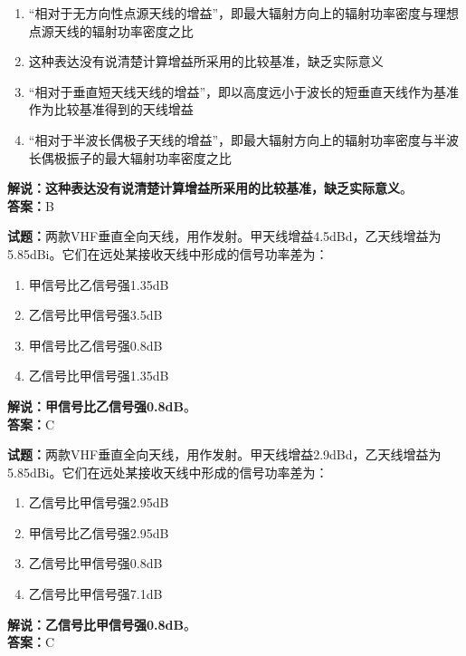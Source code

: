 \documentclass{ctexbook}
\begin{document}
\begin{enumerate}[leftmargin=3em]
	\item “相对于无方向性点源天线的增益”，即最大辐射方向上的辐射功率密度与理想点源天线的辐射功率密度之比
	\item 这种表达没有说清楚计算增益所采用的比较基准，缺乏实际意义
	\item “相对于垂直短天线天线的增益”，即以高度远小于波长的短垂直天线作为基准作为比较基准得到的天线增益
	\item “相对于半波长偶极子天线的增益”，即最大辐射方向上的辐射功率密度与半波长偶极振子的最大辐射功率密度之比
\end{enumerate}

\noindent\textbf{解说：这种表达没有说清楚计算增益所采用的比较基准，缺乏实际意义}。\\\noindent\textbf{答案：}B


\bigskip


\noindent\textbf{试题：}两款VHF垂直全向天线，用作发射。甲天线增益4.5dBd，乙天线增益为5.85dBi。它们在远处某接收天线中形成的信号功率差为：

\begin{enumerate}[leftmargin=3em]
	\item 甲信号比乙信号强1.35dB
	\item 乙信号比甲信号强3.5dB
	\item 甲信号比乙信号强0.8dB
	\item 乙信号比甲信号强1.35dB
\end{enumerate}

\noindent\textbf{解说：甲信号比乙信号强0.8dB}。\\\noindent\textbf{答案：}C%


\bigskip


\noindent\textbf{试题：}两款VHF垂直全向天线，用作发射。甲天线增益2.9dBd，乙天线增益为5.85dBi。它们在远处某接收天线中形成的信号功率差为：

\begin{enumerate}[leftmargin=3em]
	\item 乙信号比甲信号强2.95dB
	\item 甲信号比乙信号强2.95dB
	\item 乙信号比甲信号强0.8dB
	\item 乙信号比甲信号强7.1dB
\end{enumerate}

\noindent\textbf{解说：乙信号比甲信号强0.8dB}。\\\noindent\textbf{答案：}C%


\bigskip
\end{document}
